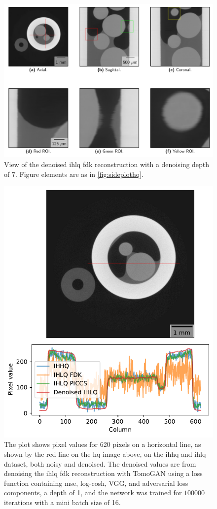 \begin{figure}[htbp]
  \centering
  \includegraphics[width=.85\textwidth]{figures/kimrobertdepth7-x475y620s250.pdf}
  \caption[View of IHLQ FDK denoised with a depth of 7]{View of the denoised \acrshort{ihlq} \acrshort{fdk} reconstruction with a denoising depth of 7. Figure elements are as in \cref{fig:sideplothq}. }
  \label{fig:sideplotdepth7}
\end{figure}

\begin{figure}[htbp]
  \centering
  \includegraphics[width=.85\textwidth]{figures/kimrobertline.pdf}
  \caption[Pixel value plot of IHHQ and IHLQ, noisy and denoised]{The plot shows pixel values for 620 pixels on a horizontal line, as shown by the red line on the \acrshort{hq} image above, on the \acrshort{ihhq} and \acrshort{ihlq} dataset, both noisy and denoised. The denoised values are from denoising the \acrshort{ihlq} \acrshort{fdk} reconstruction with TomoGAN using a loss function containing \acrshort{mse}, log-cosh, VGG, and adversarial loss components, a depth of 1, and the network was trained for $100 000$ iterations with a mini batch size of 16. }
  \label{fig:kimrobertline}
\end{figure}

